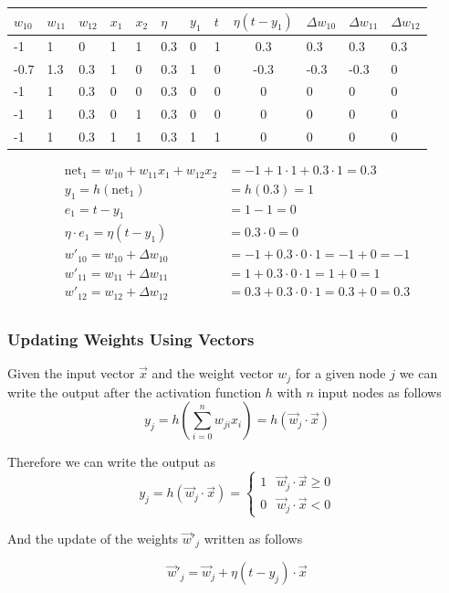 \documentclass[11pt]{article}
\begin{document}
\begin{tabularx}{\linewidth}{XXXXXXXXcXXX}
    \hline
    $w_{10}$ & $w_{11}$ & $w_{12}$ & $x_1$ & $x_2$ & $\eta$ & $y_1$ & $t$ & $\eta (t-y_1)$ & $\Delta w_{10}$ & $\Delta w_{11}$ & $\Delta w_{12}$\\
    \hline
    -1 & 1 & 0 & 1 & 1 & 0.3 & 0 & 1 & 0.3 & 0.3 & 0.3 & 0.3\\
    \hline
    -0.7 & 1.3 & 0.3 & 1 & 0 & 0.3 & 1 & 0 & -0.3 & -0.3 & -0.3 & 0\\
    \hline
    -1 & 1 & 0.3 & 0 & 0 & 0.3 & 0 & 0 & 0 & 0 & 0 & 0\\
    \hline
    -1 & 1 & 0.3 & 0 & 1 & 0.3 & 0 & 0 & 0 & 0 & 0 & 0\\
    \hline
    -1 & 1 & 0.3 & 1 & 1 & 0.3 & 1 & 1 & 0 & 0 & 0 & 0\\
    \hline
\end{tabularx}

\begin{align*}
\text{net}_1 = w_{10} + w_{11}x_1 + w_{12}x_2 &= -1 + 1 \cdot 1 + 0.3 \cdot 1 = 0.3\\
y_1 = h(\text{net}_1) &= h(0.3) = 1\\
e_1 = t - y_1 &= 1 - 1 = 0\\
\eta \cdot e_1 = \eta (t - y_1) &= 0.3\cdot 0 = 0\\
w'_{10} = w_{10} + \Delta w_{10} &= -1 + 0.3\cdot 0 \cdot 1 = -1 + 0 = -1\\
w'_{11} = w_{11} + \Delta w_{11} &= 1 + 0.3\cdot 0 \cdot 1 = 1 + 0 = 1 \\
w'_{12} = w_{12} + \Delta w_{12} &= 0.3 + 0.3\cdot 0 \cdot 1 = 0.3 + 0 = 0.3 \\
\end{align*}

\subsubsection{Updating Weights Using Vectors}

Given the input vector $\vec{x}$ and the weight vector $w_j$ for a given node $j$ we can write the output after the activation function $h$ with $n$ input nodes as follows
\begin{equation}
    y_j = h\left( \sum_{i=0}^{n} w_{ji} x_i \right) = h(\vec{w}_j \cdot \vec{x})
\end{equation}

\noindent
Therefore we can write the output as
\begin{equation}
y_j = h(\vec{w}_j \cdot \vec{x}) = \left\{ \begin{matrix} 1 & \vec{w}_j \cdot \vec{x} \geq 0\\ 0 & \vec{w}_j \cdot \vec{x} < 0 \end{matrix} \right.
\end{equation}

\noindent
And the update of the weights $\vec{w}'_j$ written as follows

\begin{equation}
    \vec{w}'_j = \vec{w}_j + \eta (t - y_j)\cdot \vec{x}
\end{equation}
\end{document}
